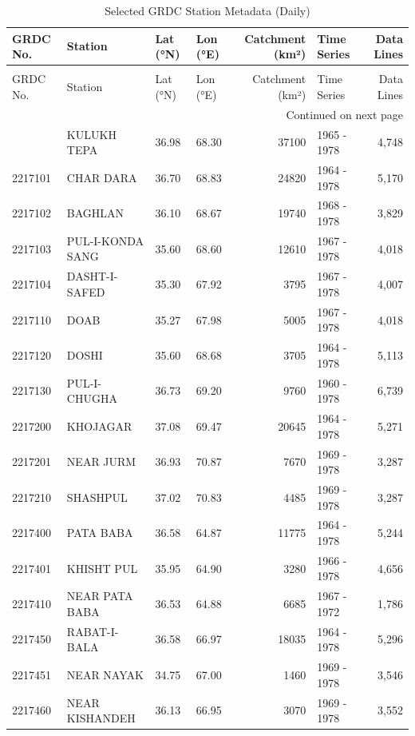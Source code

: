 \begin{longtable}{lp{4.3cm}llrlr}
\caption{Selected GRDC Station Metadata (Daily)} \label{tab:grdc_selected_metadata_daily} \\
\toprule
GRDC No. & Station & Lat (°N) & Lon (°E) & Catchment (km²) & Time Series & Data Lines \\
\midrule
\endfirsthead
\caption[]{Selected GRDC Station Metadata (Daily)} \\
\toprule
GRDC No. & Station & Lat (°N) & Lon (°E) & Catchment (km²) & Time Series & Data Lines \\
\midrule
\endhead
\midrule
\multicolumn{7}{r}{Continued on next page} \\
\midrule
\endfoot
\bottomrule
\endlastfoot
2217100 & KULUKH TEPA & 36.98 & 68.30 & 37100 & 1965 - 1978 & 4,748 \\
2217101 & CHAR DARA & 36.70 & 68.83 & 24820 & 1964 - 1978 & 5,170 \\
2217102 & BAGHLAN & 36.10 & 68.67 & 19740 & 1968 - 1978 & 3,829 \\
2217103 & PUL-I-KONDA SANG & 35.60 & 68.60 & 12610 & 1967 - 1978 & 4,018 \\
2217104 & DASHT-I-SAFED & 35.30 & 67.92 & 3795 & 1967 - 1978 & 4,007 \\
2217110 & DOAB & 35.27 & 67.98 & 5005 & 1967 - 1978 & 4,018 \\
2217120 & DOSHI & 35.60 & 68.68 & 3705 & 1964 - 1978 & 5,113 \\
2217130 & PUL-I-CHUGHA & 36.73 & 69.20 & 9760 & 1960 - 1978 & 6,739 \\
2217200 & KHOJAGAR & 37.08 & 69.47 & 20645 & 1964 - 1978 & 5,271 \\
2217201 & NEAR JURM & 36.93 & 70.87 & 7670 & 1969 - 1978 & 3,287 \\
2217210 & SHASHPUL & 37.02 & 70.83 & 4485 & 1969 - 1978 & 3,287 \\
2217400 & PATA BABA & 36.58 & 64.87 & 11775 & 1964 - 1978 & 5,244 \\
2217401 & KHISHT PUL & 35.95 & 64.90 & 3280 & 1966 - 1978 & 4,656 \\
2217410 & NEAR PATA BABA & 36.53 & 64.88 & 6685 & 1967 - 1972 & 1,786 \\
2217450 & RABAT-I-BALA & 36.58 & 66.97 & 18035 & 1964 - 1978 & 5,296 \\
2217451 & NEAR NAYAK & 34.75 & 67.00 & 1460 & 1969 - 1978 & 3,546 \\
2217460 & NEAR KISHANDEH & 36.13 & 66.95 & 3070 & 1969 - 1978 & 3,552 \\

\end{longtable}
